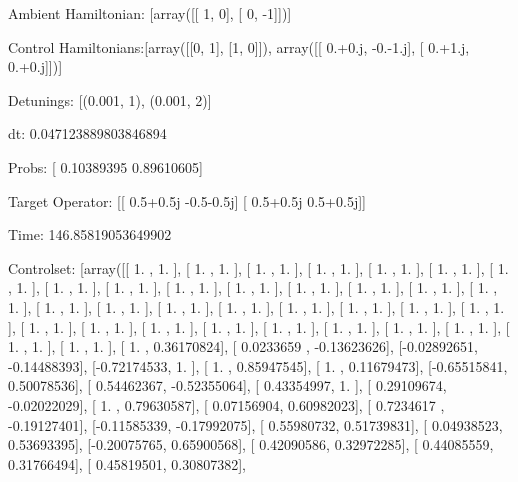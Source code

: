 \documentclass{article}
\begin{document}
    

\newpage

Ambient Hamiltonian: [array([[ 1,  0],
       [ 0, -1]])]

Control Hamiltonians:[array([[0, 1],
       [1, 0]]), array([[ 0.+0.j, -0.-1.j],
       [ 0.+1.j,  0.+0.j]])]

Detunings: [(0.001, 1), (0.001, 2)]

 dt: 0.047123889803846894

Probs: [ 0.10389395  0.89610605]

Target Operator: [[ 0.5+0.5j -0.5-0.5j]
 [ 0.5+0.5j  0.5+0.5j]]

Time: 146.85819053649902

Controlset: [array([[ 1.        ,  1.        ],
       [ 1.        ,  1.        ],
       [ 1.        ,  1.        ],
       [ 1.        ,  1.        ],
       [ 1.        ,  1.        ],
       [ 1.        ,  1.        ],
       [ 1.        ,  1.        ],
       [ 1.        ,  1.        ],
       [ 1.        ,  1.        ],
       [ 1.        ,  1.        ],
       [ 1.        ,  1.        ],
       [ 1.        ,  1.        ],
       [ 1.        ,  1.        ],
       [ 1.        ,  1.        ],
       [ 1.        ,  1.        ],
       [ 1.        ,  1.        ],
       [ 1.        ,  1.        ],
       [ 1.        ,  1.        ],
       [ 1.        ,  1.        ],
       [ 1.        ,  1.        ],
       [ 1.        ,  1.        ],
       [ 1.        ,  1.        ],
       [ 1.        ,  1.        ],
       [ 1.        ,  1.        ],
       [ 1.        ,  1.        ],
       [ 1.        ,  1.        ],
       [ 1.        ,  1.        ],
       [ 1.        ,  1.        ],
       [ 1.        ,  1.        ],
       [ 1.        ,  1.        ],
       [ 1.        ,  1.        ],
       [ 1.        ,  1.        ],
       [ 1.        ,  1.        ],
       [ 1.        ,  0.36170824],
       [ 0.0233659 , -0.13623626],
       [-0.02892651, -0.14488393],
       [-0.72174533,  1.        ],
       [ 1.        ,  0.85947545],
       [ 1.        ,  0.11679473],
       [-0.65515841,  0.50078536],
       [ 0.54462367, -0.52355064],
       [ 0.43354997,  1.        ],
       [ 0.29109674, -0.02022029],
       [ 1.        ,  0.79630587],
       [ 0.07156904,  0.60982023],
       [ 0.7234617 , -0.19127401],
       [-0.11585339, -0.17992075],
       [ 0.55980732,  0.51739831],
       [ 0.04938523,  0.53693395],
       [-0.20075765,  0.65900568],
       [ 0.42090586,  0.32972285],
       [ 0.44085559,  0.31766494],
       [ 0.45819501,  0.30807382],
\end{document}
